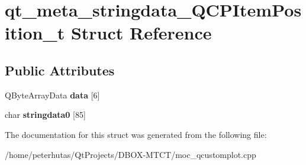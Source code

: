 \hypertarget{structqt__meta__stringdata___q_c_p_item_position__t}{}\section{qt\+\_\+meta\+\_\+stringdata\+\_\+\+Q\+C\+P\+Item\+Position\+\_\+t Struct Reference}
\label{structqt__meta__stringdata___q_c_p_item_position__t}
\subsection*{Public Attributes}
\begin{DoxyCompactItemize}
\item 
\mbox{\label{structqt__meta__stringdata___q_c_p_item_position__t_a7efdce6b4c431297ac7218626630d15f}} 
Q\+Byte\+Array\+Data {\bfseries data} \mbox{[}6\mbox{]}
\item 
\mbox{\label{structqt__meta__stringdata___q_c_p_item_position__t_a0321410c49080a232c195e07eac0ea1a}} 
char {\bfseries stringdata0} \mbox{[}85\mbox{]}
\end{DoxyCompactItemize}


The documentation for this struct was generated from the following file\+:\begin{DoxyCompactItemize}
\item 
/home/peterhutas/\+Qt\+Projects/\+D\+B\+O\+X-\/\+M\+T\+C\+T/moc\+\_\+qcustomplot.\+cpp\end{DoxyCompactItemize}
